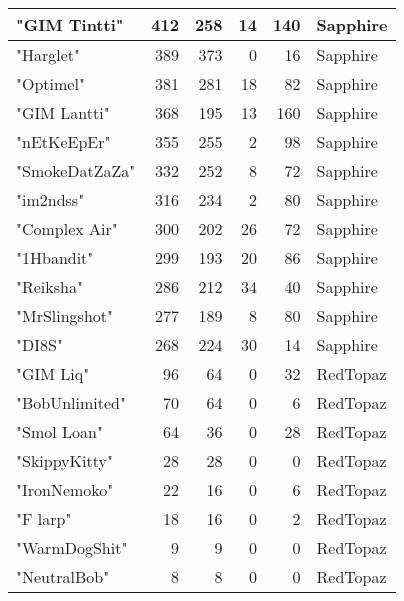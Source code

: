 \documentclass{article}
\begin{document}
\begin{table}[htbp]
\begin{tabular}{|l|r|r|r|r|l|}
"GIM Tintti" & 412 & 258 & 14 & 140 & Sapphire \\ \hline
"Harglet" & 389 & 373 & 0 & 16 & Sapphire \\ \hline
"Optimel" & 381 & 281 & 18 & 82 & Sapphire \\ \hline
"GIM Lantti" & 368 & 195 & 13 & 160 & Sapphire \\ \hline
"nEtKeEpEr" & 355 & 255 & 2 & 98 & Sapphire \\ \hline
"SmokeDatZaZa" & 332 & 252 & 8 & 72 & Sapphire \\ \hline
"im2ndss" & 316 & 234 & 2 & 80 & Sapphire \\ \hline
"Complex Air" & 300 & 202 & 26 & 72 & Sapphire \\ \hline
"1Hbandit" & 299 & 193 & 20 & 86 & Sapphire \\ \hline
"Reiksha" & 286 & 212 & 34 & 40 & Sapphire \\ \hline
"MrSlingshot" & 277 & 189 & 8 & 80 & Sapphire \\ \hline
"DI8S" & 268 & 224 & 30 & 14 & Sapphire \\ \hline
"GIM Liq" & 96 & 64 & 0 & 32 & RedTopaz \\ \hline
"BobUnlimited" & 70 & 64 & 0 & 6 & RedTopaz \\ \hline
"Smol Loan" & 64 & 36 & 0 & 28 & RedTopaz \\ \hline
"SkippyKitty" & 28 & 28 & 0 & 0 & RedTopaz \\ \hline
"IronNemoko" & 22 & 16 & 0 & 6 & RedTopaz \\ \hline
"F larp" & 18 & 16 & 0 & 2 & RedTopaz \\ \hline
"WarmDogShit" & 9 & 9 & 0 & 0 & RedTopaz \\ \hline
"NeutralBob" & 8 & 8 & 0 & 0 & RedTopaz \\ \hline
\end{tabular}
\end{table}
\end{document}
